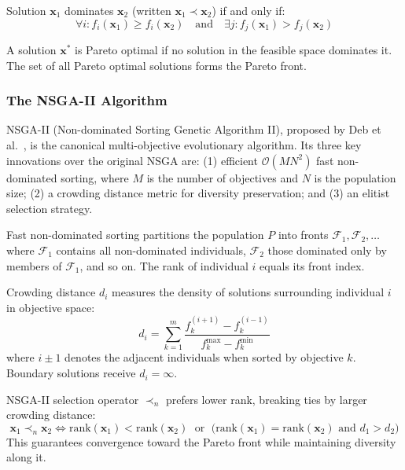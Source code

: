 \begin{definition}
Solution $\mathbf{x}_1$ dominates $\mathbf{x}_2$ (written $\mathbf{x}_1 \prec \mathbf{x}_2$) if and only if:
\begin{equation}
\forall i : f_i(\mathbf{x}_1) \geq f_i(\mathbf{x}_2) \quad \text{and} \quad \exists j : f_j(\mathbf{x}_1) > f_j(\mathbf{x}_2)
\end{equation}
\end{definition}

\begin{definition}
A solution $\mathbf{x}^*$ is Pareto optimal if no solution in the feasible space dominates it. The set of all Pareto optimal solutions forms the Pareto front.
\end{definition}

\subsubsection{The NSGA-II Algorithm}

NSGA-II (Non-dominated Sorting Genetic Algorithm II), proposed by Deb et al.\ \cite{deb2002fast}, is the canonical multi-objective evolutionary algorithm. Its three key innovations over the original NSGA are: (1) efficient $\mathcal{O}(MN^2)$ fast non-dominated sorting, where $M$ is the number of objectives and $N$ is the population size; (2) a crowding distance metric for diversity preservation; and (3) an elitist selection strategy.

Fast non-dominated sorting partitions the population $P$ into fronts $\mathcal{F}_1, \mathcal{F}_2, \ldots$ where $\mathcal{F}_1$ contains all non-dominated individuals, $\mathcal{F}_2$ those dominated only by members of $\mathcal{F}_1$, and so on. The rank of individual $i$ equals its front index.

Crowding distance $d_i$ measures the density of solutions surrounding individual $i$ in objective space:
\begin{equation}
d_i = \sum_{k=1}^{m} \frac{f_k^{(i+1)} - f_k^{(i-1)}}{f_k^{\max} - f_k^{\min}}
\label{eq:crowding_distance}
\end{equation}
where $i \pm 1$ denotes the adjacent individuals when sorted by objective $k$. Boundary solutions receive $d_i = \infty$.

NSGA-II selection operator $\prec_n$ prefers lower rank, breaking ties by larger crowding distance:
\begin{equation}
\mathbf{x}_1 \prec_n \mathbf{x}_2 \iff \text{rank}(\mathbf{x}_1) < \text{rank}(\mathbf{x}_2) \;\text{ or }\; \bigl(\text{rank}(\mathbf{x}_1) = \text{rank}(\mathbf{x}_2) \text{ and } d_1 > d_2\bigr)
\end{equation}
This guarantees convergence toward the Pareto front while maintaining diversity along it.

